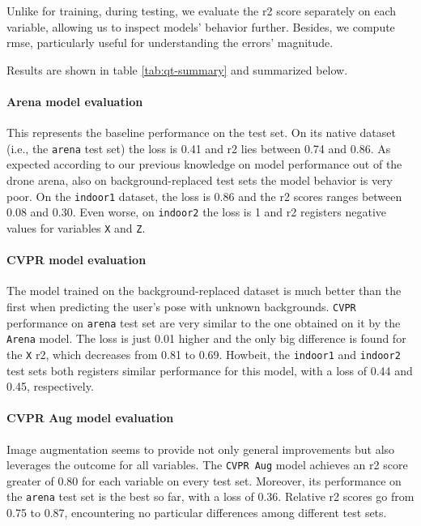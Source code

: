 Unlike for training, during testing, we evaluate the \gls{r2} score separately on each variable, allowing us to inspect models' behavior further. Besides, we compute \gls{rmse}, particularly useful for understanding the errors' magnitude.

Results are shown in table \ref{tab:qt-summary} and summarized below. 

\paragraph*{Arena model evaluation}

This represents the baseline performance on the test set. On its native dataset (i.e., the \texttt{arena} test set) the loss is 0.41 and \gls{r2} lies between 0.74 and 0.86. As expected according to our previous knowledge on model performance out of the drone arena, also on background-replaced test sets the model behavior is very poor. On the \texttt{indoor1} dataset, the loss is 0.86 and the \gls{r2} scores ranges between 0.08 and 0.30. Even worse, on \texttt{indoor2} the loss is 1 and \gls{r2} registers negative values for variables \texttt{X} and \texttt{Z}.

\paragraph*{CVPR model evaluation}

The model trained on the background-replaced dataset is much better than the first when predicting the user's pose with unknown backgrounds. \texttt{CVPR} performance on \texttt{arena} test set are very similar to the one obtained on it by the \texttt{Arena} model. The loss is just 0.01 higher and the only big difference is found for the \texttt{X} \gls{r2}, which decreases from 0.81 to 0.69. Howbeit, the \texttt{indoor1} and \texttt{indoor2} test sets both registers similar performance for this model, with a loss of 0.44 and 0.45, respectively.

\paragraph*{CVPR Aug model evaluation}

Image augmentation seems to provide not only general improvements but also leverages the outcome for all variables. The \texttt{CVPR Aug} model achieves an \gls{r2} score greater of 0.80 for each variable on every test set. Moreover, its performance on the \texttt{arena} test set is the best so far, with a loss of 0.36. Relative \gls{r2} scores go from 0.75 to 0.87, encountering no particular differences among different test sets.

